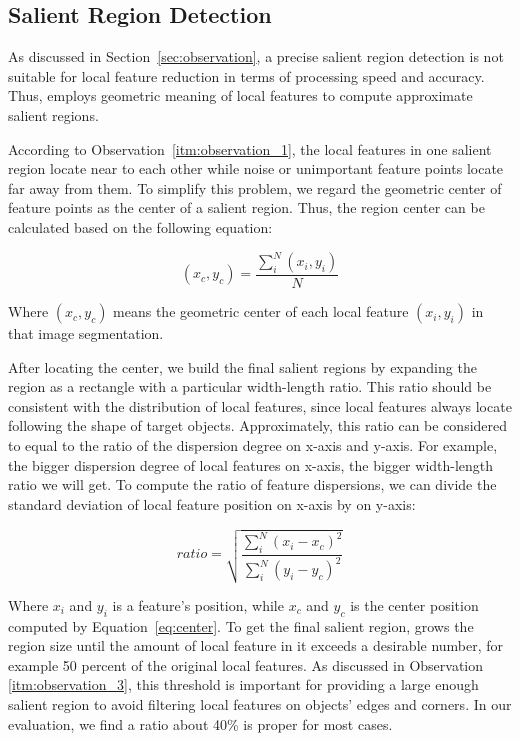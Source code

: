 \subsection{Salient Region Detection}
\label{sec:algorithm_detection}

As discussed in Section~\ref{sec:observation}, a precise salient region detection is not suitable for local feature reduction in terms of processing speed and accuracy. Thus, {\sys} employs geometric meaning of local features to compute approximate salient regions.

According to Observation~\ref{itm:observation_1}, the local features in one salient region locate near to each other while noise or unimportant feature points locate far away from them. To simplify this problem, we regard the geometric center of feature points as the center of a salient region. Thus, the region center can be calculated based on the following equation:

{\begin{equation} \label{eq:center}
\left({x}_{c},{y}_{c} \right) = \frac{\sum_{i}^{N}\left({x}_{i},{y}_{i} \right)}{N}
\end{equation}}

Where $\left({x}_{c},{y}_{c} \right)$ means the geometric center of each local feature $\left({x}_{i},{y}_{i} \right)$ in that image segmentation.

After locating the center, we build the final salient regions by expanding the region as a rectangle with a particular width-length ratio. This ratio should be consistent with the distribution of local features, since local features always locate following the shape of target objects. Approximately, this ratio can be considered to equal to the ratio of the dispersion degree on x-axis and y-axis. For example, the bigger dispersion degree of local features on x-axis, the bigger width-length ratio we will get. To compute the ratio of feature dispersions, we can divide the standard deviation of local feature position on x-axis by on y-axis:

{\begin{equation} \label{eq:ratio}
ratio = \sqrt{\frac{\sum_{i}^{N}\left ( x_{i}-x_{c} \right )^{2}}{\sum_{i}^{N}\left ( y_{i}-y_{c} \right )^{2}}}
\end{equation}}

Where $x_{i}$ and $y_{i}$ is a feature's position, while $x_{c}$ and $y_{c}$ is the center position computed by Equation~\ref{eq:center}. To get the final salient region, {\sys} grows the region size until the amount of local feature in it exceeds a desirable number, for example 50 percent of the original local features. As discussed in Observation \ref{itm:observation_3}, this threshold is important for providing a large enough salient region to avoid filtering local features on objects' edges and corners. In our evaluation, we find a ratio about 40\% is proper for most cases.


